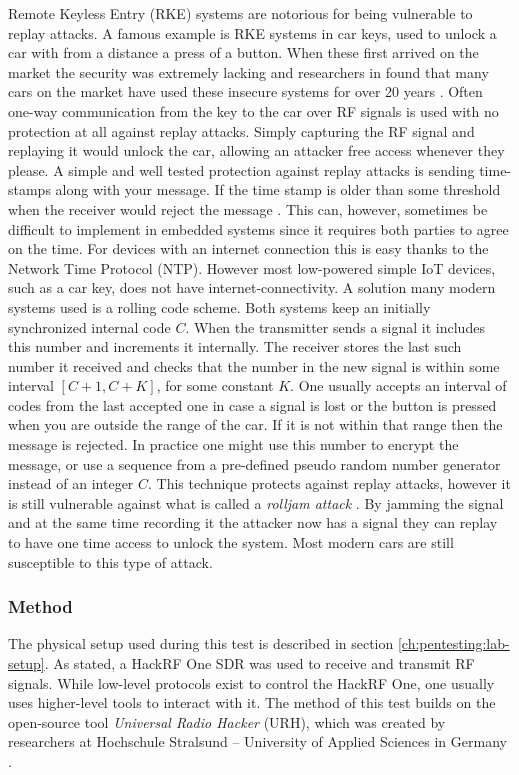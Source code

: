 Remote Keyless Entry (RKE) systems are notorious for being vulnerable to replay attacks. A famous example is RKE systems in car keys, used to unlock a car with from a distance a press of a button. When these first arrived on the market the security was extremely lacking and researchers in \citeyear{car-rke-systems} found that many cars on the market have used these insecure systems for over 20 years \cite{car-rke-systems}. Often one-way communication from the key to the car over RF signals is used with no protection at all against replay attacks. Simply capturing the RF signal and replaying it would unlock the car, allowing an attacker free access whenever they  please. A simple and well tested protection against replay attacks is sending time-stamps along with your message. If the time stamp is older than some threshold when the receiver would reject the message \cite{rke-replay}. This can, however, sometimes be difficult to implement in embedded systems since it requires both parties to agree on the time. For devices with an internet connection this is easy thanks to the Network Time Protocol (NTP). However most low-powered simple IoT devices, such as a car key, does not have internet-connectivity. A solution many modern systems used is a rolling code scheme. Both systems keep an initially synchronized internal code $C$. When the transmitter sends a signal it includes this number and increments it internally. The receiver stores the last such number it received and checks that the number in the new signal is within some interval $[C+1, C+K]$, for some constant $K$. One usually accepts an interval of codes from the last accepted one in case a signal is lost or the button is pressed when you are outside the range of the car. If it is not within that range then the message is rejected. In practice one might use this number to encrypt the message, or use a sequence from a pre-defined pseudo random number generator instead of an integer $C$. This technique protects against replay attacks, however it is still vulnerable against what is called a \textit{rolljam attack} \cite{kamkar2015drive}. By jamming the signal and at the same time recording it the attacker now has a signal they can replay to have one time access to unlock the system. Most modern cars are still susceptible to this type of attack.

\subsubsection{Method} \label{ch:pentesting:replay:method}
The physical setup used during this test is described in section \ref{ch:pentesting:lab-setup}. As stated, a HackRF One SDR was used to receive and transmit RF signals. While low-level protocols exist to control the HackRF One, one usually uses higher-level tools to interact with it. The method of this test builds on the open-source tool \textit{Universal Radio Hacker} (URH), which was created by researchers at Hochschule Stralsund – University of Applied Sciences in Germany \cite{urh}.

